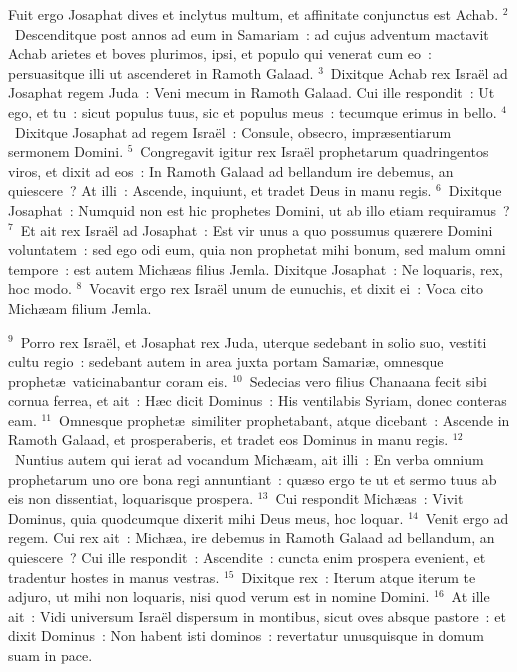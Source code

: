 \lettrine[lines=10,image=true,loversize=0.05,lraise=-0.03]{F}{}uit ergo Josaphat dives et inclytus multum, et affinitate conjunctus est Achab.
${}^{2}$~Descenditque post annos ad eum in Samariam~: ad cujus adventum mactavit Achab arietes et boves plurimos, ipsi, et populo qui venerat cum eo~: persuasitque illi ut ascenderet in Ramoth Galaad.
${}^{3}$~Dixitque Achab rex Isra\"el ad Josaphat regem Juda~: Veni mecum in Ramoth Galaad. Cui ille respondit~: Ut ego, et tu~: sicut populus tuus, sic et populus meus~: tecumque erimus in bello.
${}^{4}$~Dixitque Josaphat ad regem Isra\"el~: Consule, obsecro, impr\ae sentiarum sermonem Domini.
${}^{5}$~Congregavit igitur rex Isra\"el prophetarum quadringentos viros, et dixit ad eos~: In Ramoth Galaad ad bellandum ire debemus, an quiescere~? At illi~: Ascende, inquiunt, et tradet Deus in manu regis.
${}^{6}$~Dixitque Josaphat~: Numquid non est hic prophetes Domini, ut ab illo etiam requiramus~?
${}^{7}$~Et ait rex Isra\"el ad Josaphat~: Est vir unus a quo possumus qu\ae rere Domini voluntatem~: sed ego odi eum, quia non prophetat mihi bonum, sed malum omni tempore~: est autem Mich\ae as filius Jemla. Dixitque Josaphat~: Ne loquaris, rex, hoc modo.
${}^{8}$~Vocavit ergo rex Isra\"el unum de eunuchis, et dixit ei~: Voca cito Mich\ae am filium Jemla.


${}^{9}$~Porro rex Isra\"el, et Josaphat rex Juda, uterque sedebant in solio suo, vestiti cultu regio~: sedebant autem in area juxta portam Samari\ae , omnesque prophet\ae\ vaticinabantur coram eis.
${}^{10}$~Sedecias vero filius Chanaana fecit sibi cornua ferrea, et ait~: H\ae c dicit Dominus~: His ventilabis Syriam, donec conteras eam.
${}^{11}$~Omnesque prophet\ae\ similiter prophetabant, atque dicebant~: Ascende in Ramoth Galaad, et prosperaberis, et tradet eos Dominus in manu regis.
${}^{12}$~Nuntius autem qui ierat ad vocandum Mich\ae am, ait illi~: En verba omnium prophetarum uno ore bona regi annuntiant~: qu\ae so ergo te ut et sermo tuus ab eis non dissentiat, loquarisque prospera.
${}^{13}$~Cui respondit Mich\ae as~: Vivit Dominus, quia quodcumque dixerit mihi Deus meus, hoc loquar.
${}^{14}$~Venit ergo ad regem. Cui rex ait~: Mich\ae a, ire debemus in Ramoth Galaad ad bellandum, an quiescere~? Cui ille respondit~: Ascendite~: cuncta enim prospera evenient, et tradentur hostes in manus vestras.
${}^{15}$~Dixitque rex~: Iterum atque iterum te adjuro, ut mihi non loquaris, nisi quod verum est in nomine Domini.
${}^{16}$~At ille ait~: Vidi universum Isra\"el dispersum in montibus, sicut oves absque pastore~: et dixit Dominus~: Non habent isti dominos~: revertatur unusquisque in domum suam in pace.



